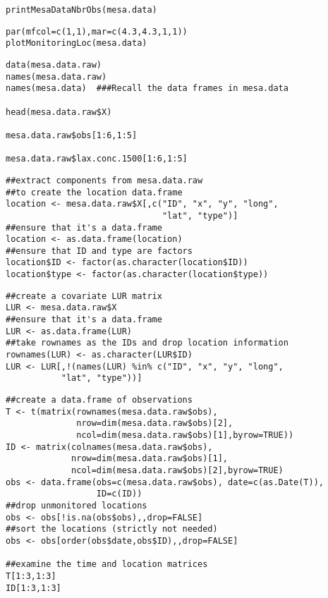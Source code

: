 \begin{verbatim}
printMesaDataNbrObs(mesa.data)
\end{verbatim}
%
\vspace*{-1\baselineskip}
\begin{verbatim}
par(mfcol=c(1,1),mar=c(4.3,4.3,1,1))
plotMonitoringLoc(mesa.data)
\end{verbatim}
\begin{verbatim}
data(mesa.data.raw)
names(mesa.data.raw)
names(mesa.data)  ###Recall the data frames in mesa.data

head(mesa.data.raw$X)

mesa.data.raw$obs[1:6,1:5]

mesa.data.raw$lax.conc.1500[1:6,1:5]
\end{verbatim}
\begin{verbatim}
##extract components from mesa.data.raw
##to create the location data.frame
location <- mesa.data.raw$X[,c("ID", "x", "y", "long",
                               "lat", "type")]
##ensure that it's a data.frame
location <- as.data.frame(location)
##ensure that ID and type are factors
location$ID <- factor(as.character(location$ID))
location$type <- factor(as.character(location$type))
\end{verbatim}
\begin{verbatim}
##create a covariate LUR matrix
LUR <- mesa.data.raw$X
##ensure that it's a data.frame
LUR <- as.data.frame(LUR)
##take rownames as the IDs and drop location information
rownames(LUR) <- as.character(LUR$ID)
LUR <- LUR[,!(names(LUR) %in% c("ID", "x", "y", "long",
           "lat", "type"))]
\end{verbatim}
\begin{verbatim}
##create a data.frame of observations
T <- t(matrix(rownames(mesa.data.raw$obs),
              nrow=dim(mesa.data.raw$obs)[2],
              ncol=dim(mesa.data.raw$obs)[1],byrow=TRUE))
ID <- matrix(colnames(mesa.data.raw$obs), 
             nrow=dim(mesa.data.raw$obs)[1],
             ncol=dim(mesa.data.raw$obs)[2],byrow=TRUE)
obs <- data.frame(obs=c(mesa.data.raw$obs), date=c(as.Date(T)), 
                  ID=c(ID))
##drop unmonitored locations
obs <- obs[!is.na(obs$obs),,drop=FALSE]
##sort the locations (strictly not needed)
obs <- obs[order(obs$date,obs$ID),,drop=FALSE]

##examine the time and location matrices
T[1:3,1:3]
ID[1:3,1:3]
\end{verbatim}
